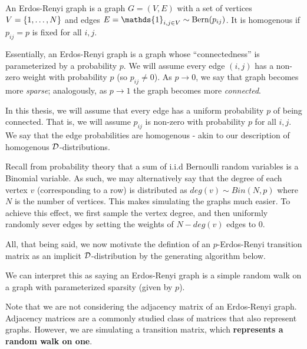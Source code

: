 \begin{definition}
An Erdos-Renyi graph is a graph $G = (V,E)$ with a set of vertices $V = \{\oneto[N]\}$ and edges $E = \mathds{1}_{i,j \in V} \sim \Bern(p_{ij})$. It is homogenous if $p_{ij} = p$ is fixed for all $i, j$.
\end{definition}

Essentially, an Erdos-Renyi graph is a graph whose ``connectedness'' is parameterized by a probability $p$.
We will assume every edge $(i,j)$ has a non-zero weight with probability $p$ (so $p_{ij} \neq 0$).
As $p \to 0$, we say that graph becomes more \textit{sparse}; analogously, as $p \to 1$ the graph becomes more \textit{connected}.

\begin{remark}[Homogeneity]
In this thesis, we will assume that every edge has a uniform probability $p$ of being connected.
That is, we will assume $p_{ij}$ is non-zero with probability $p$ for all $i,j$.
We say that the edge probabilities are homogenous - akin to our description of homogenous $\D$-distributions.
\end{remark}

Recall from probability theory that a sum of i.i.d Bernoulli random variables is a Binomial variable.
As such, we may alternatively say that the degree of each vertex $v$ (corresponding to a row) is distributed as $deg(v) \sim Bin(N,p)$ where $N$ is the number of vertices.
This makes simulating the graphs much easier. To achieve this effect, we first sample the vertex degree, and then uniformly randomly sever edges by setting the weights of $N - deg(v)$ edges to $0$. \newline

All, that being said, we now motivate the defintion of an $p$-Erdos-Renyi transition matrix as an implicit $\D$-distribution by the generating algorithm below.

\ALGerdos

We can interpret this as saying an Erdos-Renyi graph is a simple random walk on a graph with parameterized sparsity (given by $p$).

\begin{warning}
Note that we are not considering the adjacency matrix of an Erdos-Renyi graph. Adjacency matrices are a commonly studied class of matrices that also represent graphs.
However, we are simulating a transition matrix, which \textbf{represents a random walk on one}.
\end{warning}


